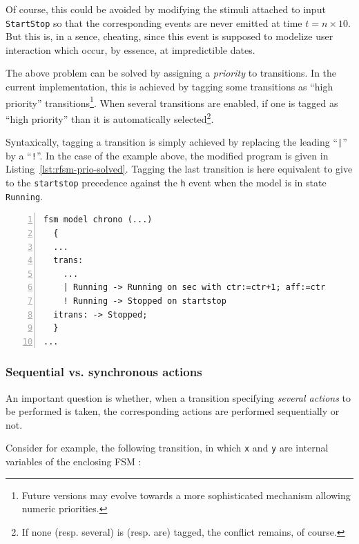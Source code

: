 Of course, this could be avoided by modifying the stimuli attached to input \verb|StartStop| so that the
corresponding events are never emitted at time $t=n\times 10$. But this is, in a sence, cheating,
since this event is supposed to modelize user interaction which occur, by essence, at impredictible
dates. 

The above problem can be solved by assigning a \emph{priority} to transitions. In the current
implementation, this is achieved by tagging some transitions as ``high priority''
transitions\footnote{Future versions may evolve towards a more sophisticated mechanism allowing
  numeric priorities.}.  When several transitions are enabled, if one is tagged as ``high priority''
than it is automatically selected\footnote{If none (resp. several) is (resp. are) tagged, the
  conflict remains, of course.}. 

Syntaxically, tagging a transition is simply achieved by replacing the leading ``\verb+|+'' by a
``\verb|!|''.  In the
case of the example above, the modified program is given in
Listing~\ref{lst:rfsm-prio-solved}. Tagging the last transition is here equivalent to give to the
\verb|startstop| precedence against the \verb|h| event when the model is in state
\verb|Running|.

\begin{lstlisting}[language=Rfsm,frame=single,numbers=left,caption=A rewriting of the model defined
  in Listing~\ref{lst:rfsm-prio-pb}, label={lst:rfsm-prio-solved},float]
fsm model chrono (...)
  {
  ...
  trans:
    ...
    | Running -> Running on sec with ctr:=ctr+1; aff:=ctr
    ! Running -> Stopped on startstop
  itrans: -> Stopped;
  }
...
\end{lstlisting}

\subsubsection{Sequential vs. synchronous actions}
\label{sec:sequ-vs.-synchr}

An important question is whether, when a transition specifying \emph{several actions} to be
performed is taken, the corresponding actions are performed sequentially or not. 

Consider for example, the following transition, in which \verb|x| and \verb|y| are internal
variables of the enclosing FSM :

\begin{center}
\end{center}

